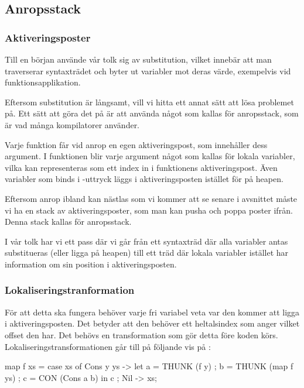 \documentclass[../Core]{subfiles}
\begin{document}
\subsection{Anropsstack}
\subsubsection{Aktiveringsposter}

Till en början använde vår tolk sig av substitution, vilket innebär att man
traverserar syntaxträdet och byter ut variabler mot deras värde, exempelvis vid
funktionsapplikation.

Eftersom substitution är långsamt, vill vi hitta ett annat sätt att lösa problemet
på. Ett sätt att göra det på är att använda något som kallas för anropsstack, som
är vad många kompilatorer använder. %

Varje funktion får vid anrop en egen aktiveringspost, som innehåller dess argument.
I funktionen blir varje argument något som kallas för lokala variabler, vilka kan representeras
som ett index in i funktionens aktiveringspost. Även variabler som binds i
-uttryck läggs i aktiveringsposten istället för på heapen. 
  
Eftersom anrop ibland kan nästlas som vi kommer att se senare i avsnittet
måste vi ha en stack av aktiveringsposter, som man kan pusha och poppa poster ifrån.
Denna stack kallas för anropsstack.

I vår tolk har vi ett pass där vi går från ett syntaxträd där alla variabler
antas substitueras (eller ligga på heapen) till ett träd där lokala variabler
istället har information om sin position i aktiveringsposten.




\subsubsection{Lokaliseringstranformation}

För att detta ska fungera behöver varje fri variabel veta var den kommer att
ligga i aktiveringsposten. Det betyder att den behöver ett heltalsindex som anger
vilket offset den har. Det behövs en transformation som gör detta före koden 
körs. Lokaliseringstransformationen går till på följande vis på : 


\begin{codeEx}
map f xs = case xs of
    { Cons y ys -> let
        { a = THUNK (f y)
        ; b = THUNK (map f ys)
        ; c = CON (Cons a b)
        } in c
    ; Nil -> xs};
\end{codeEx}
\end{document}
